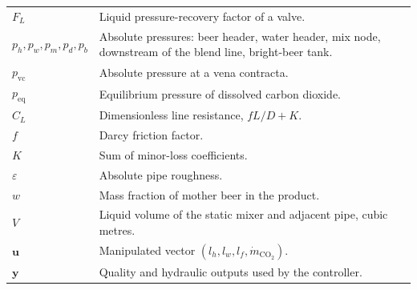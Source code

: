 \documentclass[12pt,a4paper]{report}
\numberwithin{equation}{chapter}
\numberwithin{figure}{chapter}
\numberwithin{table}{chapter}
\begin{document}
\begin{longtable}{@{}lp{}@{}}
$F_L$ & Liquid pressure-recovery factor of a valve. \\
$p_h,p_w,p_m,p_d,p_b$ & Absolute pressures: beer header, water header, mix node, downstream of the blend line, bright-beer tank. \\
$p_{\mathrm{vc}}$ & Absolute pressure at a vena contracta. \\
$p_{\mathrm{eq}}$ & Equilibrium pressure of dissolved carbon dioxide. \\
$C_L$ & Dimensionless line resistance, $fL/D+K$. \\
$f$ & Darcy friction factor. \\
$K$ & Sum of minor-loss coefficients. \\
$\varepsilon$ & Absolute pipe roughness. \\
$w$ & Mass fraction of mother beer in the product. \\
$V$ & Liquid volume of the static mixer and adjacent pipe, cubic metres. \\
$\mathbf{u}$ & Manipulated vector $(l_h,l_w,l_f,\dot m_{\mathrm{CO_2}})$. \\
$\mathbf{y}$ & Quality and hydraulic outputs used by the controller. \\
\bottomrule
\end{longtable}







\end{document}
